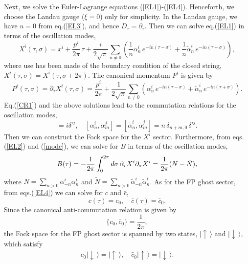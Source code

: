 \documentclass[12pt,a4paper]{article}
\newcommand{\nn}{\nonumber\\}
\newcommand{\ptau}{\partial_\tau}
\newcommand{\psig}{\partial_\sigma}
\newcommand{\ket}[1]{|#1\rangle}
\begin{document}
Next, we solve the Euler-Lagrange equations (\ref{EL1})-(\ref{EL4}).
Henceforth, we choose the Landau gauge ($\xi=0$) only for simplicity.
In the Landau gauge, we have $u=0$ from eq.(\ref{EL3}),
and hence $D_{\tau}=\ptau$.  Then we can solve eq.(\ref{EL1}) in
terms of the oscillation modes,
\begin{equation}
  X^i(\tau,\sigma)=x^i+\frac{p^i}{2\pi}\,\tau +\frac{i}{2\sqrt{\pi}}
	\sum_{n\ne 0}\left(\frac{1}{n}\alpha_n^i\,e^{-in(\tau-\sigma)}
	 +\frac{1}{n}\tilde{\alpha}_n^i\,
	e^{-in(\tau+\sigma)}\right),\label{mode}
\end{equation}
where use has been made of the boundary condition of the closed string,
$X^i(\tau,\sigma)=X^i(\tau,\sigma +2\pi)$.
The canonical momentum $P^i$ is given by
\begin{equation}
  P^i(\tau,\sigma)=\ptau X^i (\tau,\sigma)
	=\frac{p^i}{2\pi} +\frac{1}{2\sqrt{\pi}}
	\sum_{n\ne 0}\left(\alpha_n^i\, e^{-in(\tau-\sigma)}
	+\tilde{\alpha}_n^i\,e^{-in(\tau+\sigma)}\right).
\end{equation}
Eq.(\ref{CR1}) and the above solutions lead to the commutation
relations for the oscillation modes,
\begin{equation}
  [x^i,p^j]=i\delta^{ij},\quad[\alpha_n^i,\alpha_m^j]=
    [\tilde{\alpha}_n^i,\tilde{\alpha}_m^j]=n\,\delta_{n+m,0}\,\delta^{ij}.
\end{equation}
Then we can construct the Fock space for the $X^i$ sector.
Furthermore, from eqs.(\ref{EL2}) and (\ref{mode}), we can solve for
$B$ in terms of the oscillation modes,
\begin{equation}
  B(\tau)=-\frac{1}{2\pi}\int_0^{2\pi}d\sigma\,\ptau X^i\psig X^i\nn
  =\frac{1}{2\pi}(N-\tilde{N}),
\end{equation}
where $N=\sum_{n > 0}\alpha_{-n}^i\alpha_n^i$ and $\tilde{N}
=\sum_{n>0}\tilde{\alpha}_{-n}^i\tilde{\alpha}_n^i$.
As for the FP ghost sector, from eqs.(\ref{EL4}) we can solve for $c$
and $\bar{c}$,
\begin{equation}
  c(\tau)=c_0,\quad\bar{c}(\tau)=\bar{c}_0.\label{ghost}
\end{equation}
Since the canonical anti-commutation relation is given by
\begin{equation}
  \{c_0,\bar{c}_0\}=\frac{1}{2\pi},
\end{equation}
the Fock space for the FP ghost sector is spanned by two states,
$\ket{\!\uparrow\,}$ and $\ket{\!\downarrow\,}$, which satisfy
\begin{eqnarray}
  c_0 \ket{\!\downarrow\,}= \ket{\!\uparrow\,},\quad
  \bar{c}_0 \ket{\!\uparrow\,}= \ket{\!\downarrow\,}.
\end{eqnarray}
\end{document}
